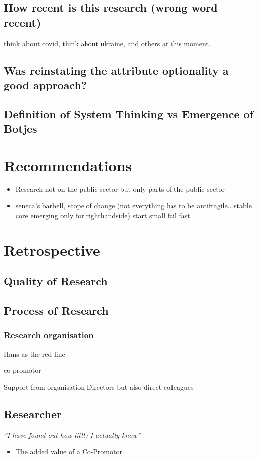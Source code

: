 \subsection{How recent is this research (wrong word recent)}

think about covid, think about ukraine, and others at this moment.


\subsection{Was reinstating the attribute optionality a good approach?}
\label{sub:reinstating optionality}


\subsection{Definition of System Thinking vs Emergence of Botjes}
\label{sub:systemsthinkingdiscussion}

\section{Recommendations}
\label{sec:reccomandations}

\begin{itemize}
	\item{Research not on the public sector but only parts of the public sector}
	\item{seneca's barbell, scope of change (not everything has to be antifragile.. stable core emerging only for righthandside) start small fail fast}
\end{itemize}

\section{Retrospective}
\label{sec:retrospective}

\subsection{Quality of Research}

\subsection{Process of Research}

\subsubsection{Research organisation}

Hans as the red line

co promotor

Support from organisation
Directors but also direct colleagues



\subsection{Researcher}

\begin{center}
	\textit{''I have found out how little I actually know''}
\end{center}

\begin{itemize}
	\item{The added value of a Co-Promotor}
\end{itemize}